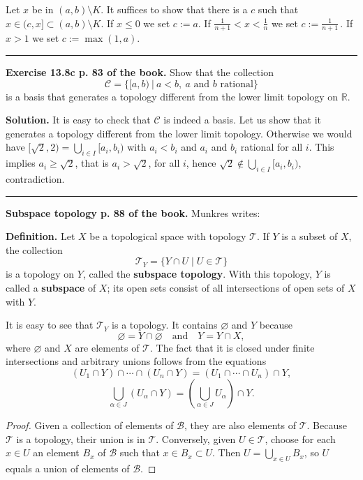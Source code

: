 \documentclass[12pt,letterpaper]{article}
\newcommand{\hs}{\bigskip\hrule\medskip}
\newcommand{\mc}{\mathcal}
\newcommand{\noi}{\noindent}%
\newcommand{\sm}{\setminus}
\newcommand{\R}{\mathbb R}
\begin{document}
Let $x$ be in $(a,b)\sm K$. It suffices to show that there is a $c$ such that $x\in(c,x]\subset(a,b)\sm K$. If $x\le0$ we set $c:=a$. If $\frac1{n+1}<x<\frac1n$ we set $c:=\frac1{n+1}\,$. If $x>1$ we set $c:=\max(1,a)$. 

\hs

\noi\textbf{Exercise 13.8c p. 83 of the book.} Show that the collection 
$$
\mc C=\{[a,b)\ |\ a<b,\ a \text{ and $b$ rational}\}
$$ 
is a basis that generates a topology different from the lower limit topology on $\R$. 

\noi\textbf{Solution.} It is easy to check that $\mc C$ is indeed a basis. Let us show that it generates a topology different from the lower limit topology. Otherwise we would have $[\sqrt2,2)=\bigcup_{i\in I}[a_i,b_i)$ with $a_i<b_i$ and $a_i$ and $b_i$ rational for all $i$. This implies $a_i\ge\sqrt2$, that is $a_i>\sqrt2$, for all $i$, hence $\sqrt2\notin\bigcup_{i\in I}[a_i,b_i)$, contradiction. 

\hs

\noi\textbf{Subspace topology p. 88 of the book.} Munkres writes: 

\noi\textbf{Definition.} Let $X$ be a topological space with topology $\mathcal{T}$. If $Y$ is a subset of $X$, the collection
\[
\mathcal{T}_Y = \{Y \cap U \mid U \in \mathcal{T}\}
\]
is a topology on $Y$, called the \textbf{subspace topology}. With this topology, $Y$ is called a \textbf{subspace} of $X$; its open sets consist of all intersections of open sets of $X$ with $Y$. %

It is easy to see that $\mathcal{T}_Y$ is a topology. It contains $\varnothing$ and $Y$ because
\[
\varnothing = Y \cap \varnothing \quad \text{and} \quad Y = Y \cap X,
\]
where $\varnothing$ and $X$ are elements of $\mathcal{T}$. The fact that it is closed under finite intersections and arbitrary unions follows from the equations
\[
(U_1 \cap Y) \cap \cdots \cap (U_n \cap Y) = (U_1 \cap \cdots \cap U_n) \cap Y,
\]
\[
\bigcup_{\alpha \in J} (U_\alpha \cap Y) = \left(\bigcup_{\alpha \in J} U_\alpha\right) \cap Y.
\] 

\begin{proof}
Given a collection of elements of $\mathcal{B}$, they are also elements of $\mathcal{T}$. Because $\mathcal{T}$ is a topology, their union is in $\mathcal{T}$. Conversely, given $U \in \mathcal{T}$, choose for each $x \in U$ an element $B_x$ of $\mathcal{B}$ such that $x \in B_x \subset U$. Then $U = \bigcup_{x\in U} B_x$, so $U$ equals a union of elements of $\mathcal{B}$.
\end{proof} 
\end{document}
